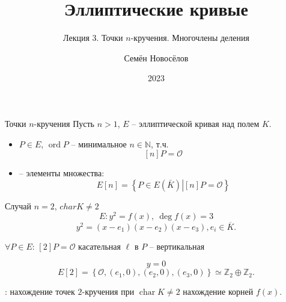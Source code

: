 \documentclass{beamer}
\title{Эллиптические кривые}
\subtitle{Лекция 3. Точки $n$-кручения. Многочлены деления}
\author{Семён Новосёлов}
\institute{БФУ им. И. Канта}
\date{2023}
\begin{document}
\frame{\titlepage}

\begin{frame}{Точки $n$-кручения}
Пусть $n > 1$, $E$ -- эллиптической кривая над полем $K$.
\begin{itemize}
    \item {} $P \in E$, $\operatorname{ord} P$ -- минимальное $n \in \mathbb{N}$, т.ч.
    \[
    [n] P = \mathcal{O}
    \]
    \item {} -- элементы множества:
    \[
    E[n] = \left\{ {\left. P \in E(\bar K)\right| [n]P = \mathcal{O}} \right\}
    \]
\end{itemize}
\end{frame}


\begin{frame}{Случай $n=2$, $charK \ne 2$}
\[
E: {y^2} = f(x), ~ \deg f\left( x \right) = 3
\]
\structure{\[\Downarrow\]}
\[
y^2 = \left( {x - {e_1}} \right)\left( {x - {e_2}} \right)\left( {x - {e_3}} \right), e_i \in \overline{K}.
\]
\begin{center}
$\forall P \in E$: $[2] P = \mathcal{O}$ \structure{$\Leftrightarrow$} касательная $\ell$ в $P$ -- вертикальная
\end{center}
\structure{\[\Downarrow\]}
\[
y = 0
\]
\structure{\[\Downarrow\]}
\[
E[2] = \left\{ \mathcal{O}, (e_1, 0), (e_2 ,0), (e_3,0) \right\} \simeq \mathbb{Z}_2 \oplus \mathbb{Z}_2.
\]
    
: нахождение точек $2$-кручения при $\operatorname{char}K \ne 2$ \structure{$\Leftrightarrow$} нахождение корней $f(x)$.
\end{frame}
\end{document}
